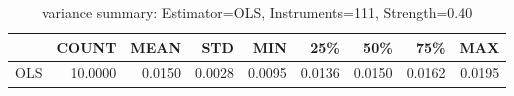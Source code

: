 \begin{table}[ht]
\centering
\caption{variance summary: Estimator=OLS, Instruments=111, Strength=0.40}
\begin{tabular}{lrrrrrrrr}
\toprule
 & COUNT & MEAN & STD & MIN & 25\% & 50\% & 75\% & MAX \\
\midrule
OLS & 10.0000 & 0.0150 & 0.0028 & 0.0095 & 0.0136 & 0.0150 & 0.0162 & 0.0195 \\
\bottomrule
\end{tabular}
\end{table}

